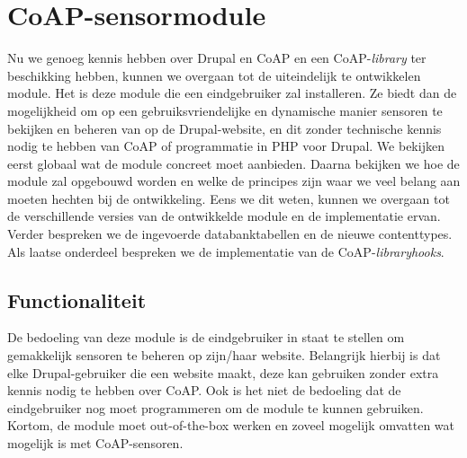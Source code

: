 \chapter{CoAP-sensormodule} \label{sensormodule}

Nu we genoeg kennis hebben over Drupal en CoAP en een CoAP-\textit{library} ter beschikking hebben, kunnen we overgaan tot de uiteindelijk te ontwikkelen module. Het is deze module die een eindgebruiker zal installeren. Ze biedt dan de mogelijkheid om op een gebruiksvriendelijke en dynamische manier sensoren te bekijken en beheren van op de Drupal-website, en dit zonder technische kennis nodig te hebben van CoAP of programmatie in PHP voor Drupal. We bekijken eerst globaal wat de module concreet moet aanbieden. Daarna bekijken we hoe de module zal opgebouwd worden en welke de principes zijn waar we veel belang aan moeten hechten bij de ontwikkeling. Eens we dit weten, kunnen we overgaan tot de verschillende versies van de ontwikkelde module en de implementatie ervan. Verder bespreken we de ingevoerde databanktabellen en de nieuwe contenttypes. Als laatse onderdeel bespreken we de implementatie van de CoAP-\textit{library}\textit{hooks}.

\section{Functionaliteit}

De bedoeling van deze module is de eindgebruiker in staat te stellen om gemakkelijk sensoren te beheren op zijn/haar website. Belangrijk hierbij is dat elke Drupal-gebruiker die een website maakt, deze kan gebruiken zonder extra kennis nodig te hebben over CoAP. Ook is het niet de bedoeling dat de eindgebruiker nog moet programmeren om de module te kunnen gebruiken. Kortom, de module moet out-of-the-box werken en zoveel mogelijk omvatten wat mogelijk is met CoAP-sensoren.\\

